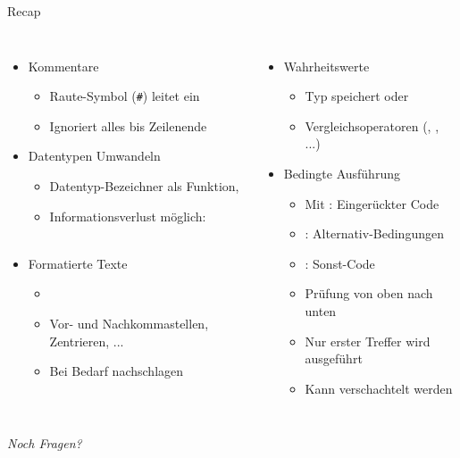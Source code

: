
\begin{frame}[t,plain]
\titlepage
\end{frame}


\begin{frame}{Recap}
%
\begin{columns}[T]
\begin{itemize}
\item Kommentare
	\begin{itemize}
	\item Raute-Symbol (\texttt{\#}) leitet ein 
	\item Ignoriert alles bis Zeilenende
	\end{itemize}
\item Datentypen Umwandeln
	\begin{itemize}
	\item Datentyp-Bezeichner als Funktion, \zB {}
	\item Informationsverlust möglich: \\
		 ~\thus~ 
	\end{itemize}
\item Formatierte Texte
	\begin{itemize}
	\item {}
	\item Vor- und Nachkommastellen, Zentrieren, ...
	\item Bei Bedarf nachschlagen
	\end{itemize}
\end{itemize}
%
\begin{itemize}
\item Wahrheitswerte
	\begin{itemize}
	\item Typ  speichert  oder 
	\item Vergleichsoperatoren (\inPy{==}, \inPy{>=}, ...)
	\end{itemize}
\item Bedingte Ausführung
	\begin{itemize}
	\item Mit : Eingerückter Code
	\item {}: Alternativ-Bedingungen
	\item {}: Sonst-Code
	\item Prüfung von oben nach unten
	\item Nur erster Treffer wird ausgeführt
	\item Kann verschachtelt werden
	\end{itemize}
\end{itemize}
\end{columns}
%
\begin{center}
	\emph{Noch Fragen?}
\end{center}
%
\end{frame}

